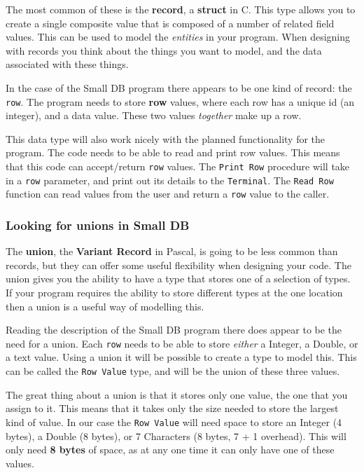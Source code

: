 The most common of these is the \textbf{record}, a \textbf{struct} in C. This type allows you to create a single composite value that is composed of a number of related field values. This can be used to model the \emph{entities} in your program. When designing with records you think about the things you want to model, and the data associated with these things.

In the case of the Small DB program there appears to be one kind of record: the \texttt{row}. The program needs to store \textbf{row} values, where each row has a unique id (an integer), and a data value. These two values \emph{together} make up a row.

This data type will also work nicely with the planned functionality for the program. The code needs to be able to read and print row values. This means that this code can accept/return \texttt{row} values. The \texttt{Print Row} procedure will take in a \texttt{row} parameter, and print out its details to the \texttt{Terminal}. The \texttt{Read Row} function can read values from the user and return a \texttt{row} value to the caller.


\subsubsection{Looking for unions in Small DB} %
\label{ssub:looking_for_unions_in_small_db}

The \textbf{union}, the \textbf{Variant Record} in Pascal, is going to be less common than records, but they can offer some useful flexibility when designing your code. The union gives you the ability to have a type that stores one of a selection of types. If your program requires the ability to store different types at the one location then a union is a useful way of modelling this.

Reading the description of the Small DB program there does appear to be the need for a union. Each \texttt{row} needs to be able to store \emph{either} a Integer, a Double, or a text value. Using a union it will be possible to create a type to model this. This can be called the \texttt{Row Value} type, and will be the union of these three values.

The great thing about a union is that it stores only one value, the one that you assign to it. This means that it takes only the size needed to store the largest kind of value. In our case the \texttt{Row Value} will need space to store an Integer (4 bytes), a Double (8 bytes), or 7 Characters (8 bytes, 7 + 1 overhead). This will only need \textbf{8 bytes} of space, as at any one time it can only have one of these values. 

